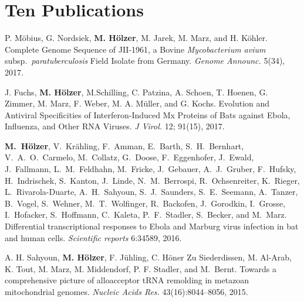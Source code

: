 \documentclass[a4paper,10pt]{article} %
\begin{document}
\section{\textbf{Ten Publications}}  

\begin{small}

P. Möbius, G. Nordsiek, \textbf{M. Hölzer}, M. Jarek, M. Marz, and H. Köhler.
Complete Genome Sequence of JII-1961, a Bovine \emph{Mycobacterium avium} subsp.\ \emph{paratuberculosis} Field Isolate from Germany.
\emph{Genome Announc.} 5(34), 2017. 

J. Fuchs, \textbf{M. Hölzer}, M.Schilling, C. Patzina, A. Schoen, T. Hoenen, G. Zimmer, M. Marz, F. Weber, M. A. Müller, and G. Kochs.
Evolution and Antiviral Specificities of Interferon-Induced Mx Proteins of Bats against Ebola, Influenza, and Other RNA Viruses.
\emph{J Virol.} 12; 91(15), 2017. 

\textbf{M.~H\"olzer}, V.~Kr\"ahling, F.~Amman, E.~Barth, S.~H.~Bernhart, V.~A.~O.~Carmelo,  M.~Collatz, G.~Doose, F.~Eggenhofer, J.~Ewald, J.~Fallmann, L.~M.~Feldhahn, M.~Fricke, J.~Gebauer, A.~J.~Gruber, F.~Hufsky, H.~Indrischek, S.~Kanton, J.~Linde, N.~M.~Berrospi, R.~Ochsenreiter, K.~Rieger, L.~Rivarola-Duarte, A.~H.~Sahyoun, S.~J.~Saunders, S.~E.~Seemann, A.~Tanzer, B.~Vogel, S.~Wehner, M.~T.~Wolfinger, R.~Backofen, J.~Gorodkin, I.~Grosse, I.~Hofacker, S.~Hoffmann, C.~Kaleta, P.~F.~Stadler, S.~Becker, and M.~Marz.
Differential transcriptional responses to Ebola and Marburg virus infection in bat and human cells.
\emph{Scientific reports} 6:34589, 2016.

A. H. Sahyoun, \textbf{M. Hölzer}, F. Jühling, C. Höner Zu Siederdissen, M. Al-Arab, K. Tout, M. Marz, M. Middendorf, P. F. Stadler, and M.~Bernt. 
Towards a comprehensive picture of alloacceptor {tRNA} remolding in metazoan mitochondrial genomes. 
\emph{Nucleic Acids Res.} 43(16):8044--8056, 2015.

\end{small}





\end{document}
